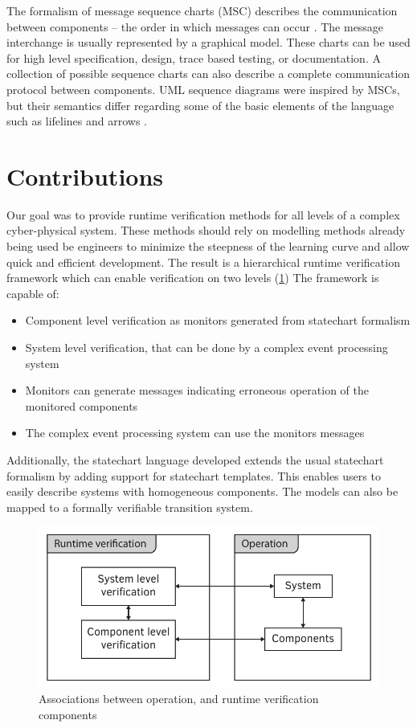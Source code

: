 The formalism of message sequence charts (MSC) describes the communication between components -- the order in which messages can occur \citep{msc} \citep{msc2}. The message interchange is usually represented by a graphical model. These charts can be used for high level specification, design, trace based testing, or documentation. A collection of possible sequence charts can also describe a complete communication protocol between components. UML sequence diagrams were inspired by MSCs, but their semantics differ regarding some of the basic elements of the language such as lifelines and arrows \citep{mscuml}.

\section{Contributions}

Our goal was to provide runtime verification methods for all levels of a complex cyber-physical system. These methods should rely on modelling methods already being used be engineers to minimize the steepness of the learning curve and allow quick and efficient development. The result is a hierarchical runtime verification framework which can enable verification on two levels (\cref{fig:intro:concept_component}) The framework is capable of:
\begin{itemize}
  \item Component level verification as monitors generated from statechart formalism
  \item System level verification, that can be done by a complex event processing system
  \item Monitors can generate messages indicating erroneous operation of the monitored components
  \item The complex event processing system can use the monitors messages
\end{itemize}

Additionally, the statechart language developed extends the usual statechart formalism by adding support for statechart templates. This enables users to easily describe systems with homogeneous components. The models can also be mapped to a formally verifiable transition system.

\begin{figure}[H]
	\centering
	\includegraphics[width=0.65\linewidth]{include/figures/chapter_1/rv_overview}
	\caption{Associations between operation, and runtime verification components}
	\label{fig:intro:concept_component}
\end{figure}

